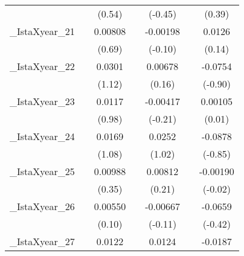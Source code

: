 {\begin{tabular}{l*{6}{c}}
            &                     &      (0.54)         &                     &     (-0.45)         &                     &      (0.39)         \\
[1em]
\_IstaXyear\_21&                     &     0.00808         &                     &    -0.00198         &                     &      0.0126         \\
            &                     &      (0.69)         &                     &     (-0.10)         &                     &      (0.14)         \\
[1em]
\_IstaXyear\_22&                     &      0.0301         &                     &     0.00678         &                     &     -0.0754         \\
            &                     &      (1.12)         &                     &      (0.16)         &                     &     (-0.90)         \\
[1em]
\_IstaXyear\_23&                     &      0.0117         &                     &    -0.00417         &                     &     0.00105         \\
            &                     &      (0.98)         &                     &     (-0.21)         &                     &      (0.01)         \\
[1em]
\_IstaXyear\_24&                     &      0.0169         &                     &      0.0252         &                     &     -0.0878         \\
            &                     &      (1.08)         &                     &      (1.02)         &                     &     (-0.85)         \\
[1em]
\_IstaXyear\_25&                     &     0.00988         &                     &     0.00812         &                     &    -0.00190         \\
            &                     &      (0.35)         &                     &      (0.21)         &                     &     (-0.02)         \\
[1em]
\_IstaXyear\_26&                     &     0.00550         &                     &    -0.00667         &                     &     -0.0659         \\
            &                     &      (0.10)         &                     &     (-0.11)         &                     &     (-0.42)         \\
[1em]
\_IstaXyear\_27&                     &      0.0122         &                     &      0.0124         &                     &     -0.0187         \\

\end{tabular}}
